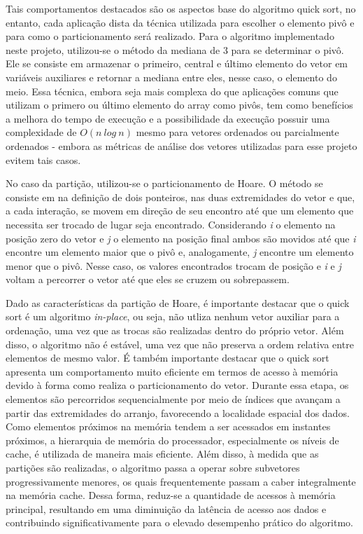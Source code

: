 \documentclass{article}
\begin{document}
        Tais comportamentos destacados são os aspectos base do algoritmo quick sort, no entanto, cada aplicação dista da técnica utilizada para escolher o elemento pivô e para como o particionamento será realizado.
        Para o algoritmo implementado neste projeto, utilizou-se o método da mediana de 3 para se determinar o pivô. Ele se consiste em armazenar o primeiro, central e último elemento do vetor em variáveis auxiliares e retornar a mediana entre eles, nesse caso, o elemento do meio.
        Essa técnica, embora seja mais complexa do que aplicações comuns que utilizam o primero ou último elemento do array como pivôs, tem como benefícios a melhora do tempo de execução e a possibilidade da execução possuir uma complexidade de $O(n \ log \ n)$ mesmo para vetores ordenados ou parcialmente ordenados - embora as métricas de análise dos vetores utilizadas para esse projeto evitem tais casos.

        No caso da partição, utilizou-se o particionamento de Hoare. 
        O método se consiste em na definição de dois ponteiros, nas duas extremidades do vetor e que, a cada interação, se movem em direção de seu encontro até que um elemento que necessita ser trocado de lugar seja encontrado. 
        Considerando \textit{i} o elemento na posição zero do vetor e \textit{j} o elemento na posição final ambos são movidos até que \textit{i} encontre um elemento maior que o pivô e, analogamente, \textit{j} encontre um elemento menor que o pivô.
        Nesse caso, os valores encontrados trocam de posição e \textit{i} e \textit{j} voltam a percorrer o vetor até que eles se cruzem ou sobrepassem. 

        Dado as características da partição de Hoare, é importante destacar que o quick sort é um algoritmo \textit{in-place}, ou seja, não utliza nenhum vetor auxiliar para a ordenação, uma vez que as trocas são realizadas dentro do próprio vetor.
        Além disso, o algoritmo não é estável, uma vez que não preserva a ordem relativa entre elementos de mesmo valor. 
        É também importante destacar que o quick sort apresenta um comportamento muito eficiente em termos de acesso à memória devido à forma como realiza o particionamento do vetor. 
        Durante essa etapa, os elementos são percorridos sequencialmente por meio de índices que avançam a partir das extremidades do arranjo, favorecendo a localidade espacial dos dados. 
        Como elementos próximos na memória tendem a ser acessados em instantes próximos, a hierarquia de memória do processador, especialmente os níveis de cache, é utilizada de maneira mais eficiente. Além disso, à medida que as partições são realizadas, o algoritmo passa a operar sobre subvetores progressivamente menores, os quais frequentemente passam a caber integralmente na memória cache. 
        Dessa forma, reduz-se a quantidade de acessos à memória principal, resultando em uma diminuição da latência de acesso aos dados e contribuindo significativamente para o elevado desempenho prático do algoritmo.
\end{document}
